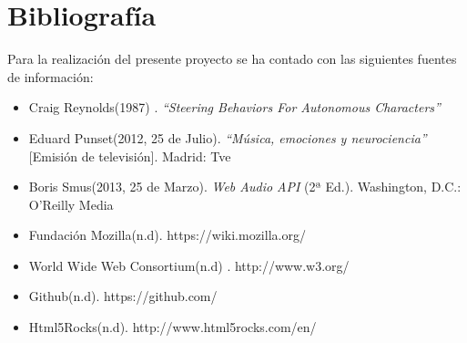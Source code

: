 \section{Bibliografía}
\label{section:bibliografia}

Para la realización del presente proyecto se ha contado con las siguientes fuentes de información:

\begin{itemize}
 \item Craig Reynolds(1987) . \textit{“Steering Behaviors For Autonomous Characters”}
 \item Eduard Punset(2012, 25 de Julio). \textit{“Música, emociones y neurociencia”} [Emisión de televisión]. Madrid: Tve
 \item Boris Smus(2013, 25 de Marzo). \textit{Web Audio API} (2ª Ed.). Washington, D.C.:  O'Reilly Media
 \item Fundación Mozilla(n.d). https://wiki.mozilla.org/
 \item World Wide Web Consortium(n.d) . http://www.w3.org/
 \item Github(n.d). https://github.com/
 \item Html5Rocks(n.d). http://www.html5rocks.com/en/
\end{itemize}

